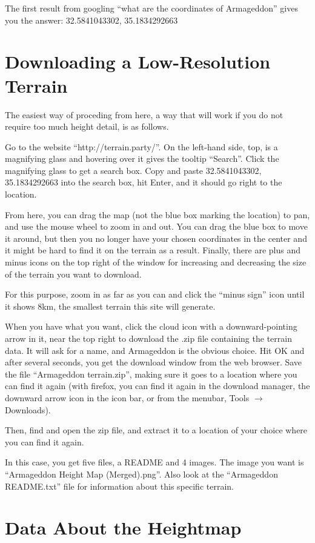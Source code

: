 \documentclass[letter,12pt]{article}
\begin{document}
The first result from googling “what are the coordinates of Armageddon” gives you the answer: 32.5841043302,  35.1834292663

\section{Downloading a Low-Resolution Terrain}
The easiest way of proceding from here, a way that will work if you do not require too much height detail, is as follows.

Go to the website “http://terrain.party/”.  On the left-hand side, top, is a magnifying glass and hovering over it gives the tooltip “Search”.  Click the magnifying glass to get a search box.  Copy and paste  32.5841043302,  35.1834292663
 into the search box, hit Enter, and it should go right to the location.
 
 From here, you can drag the map (not the blue box marking the location) to pan, and use the mouse wheel to zoom in and out.  You can drag the blue box to move it around, but then you no longer have your chosen coordinates in the center and it might be hard to find it on the terrain as a result.  Finally, there are plus and minus icons on the top right of the window for increasing and decreasing the size of the terrain you want to download.
 
 For this purpose, zoom in as far as you can and click the “minus sign” icon until it shows 8km, the smallest terrain this site will generate.
 
When you have what you want, click the cloud icon with a downward-pointing arrow in it, near the top right to download the .zip file containing the terrain data.  It will ask for a name, and Armageddon is the obvious choice.  Hit OK and after several seconds, you get the download window from the web browser.  Save the file “Armageddon terrain.zip”, making sure it goes to a location where you can find it again (with firefox, you can find it again in the download manager, the downward arrow icon in the icon bar, or from the menubar, Tools $\rightarrow$ Downloads).

Then, find and open the zip file, and extract it to a location of your choice where you can find it again.

In this case, you get five files, a README and 4 images.  The image you want is “Armageddon Height Map (Merged).png”.  Also look at the “Armageddon README.txt” file for information about this specific terrain.

\section{Data About the Heightmap}
\end{document}
